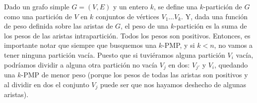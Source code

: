 \documentclass[11pt, a4paper, twoside]{article}
\begin{document}


Dado un grafo simple $G = (V,E)$ y un entero $k$, se define una $k$-partición de $G$ como
una partición de $V$ en $k$ conjuntos de vértices $V_{1} \dots V_{k}$. Y, dada una función
de peso definida sobre las aristas de $G$, el peso de una $k$-partición es la suma de los pesos
de las aristas intrapartición. Todos los pesos son positivos. Entonces, es importante notar que
siempre que busquemos una $k$-PMP, y si $k < n$, no vamos a tener ninguna partición vacía. Puesto 
que si tuviéramos alguna partición $V_{i}$ vacía, podríamos dividir a alguna otra partición no
vacía $V_{j}$ en dos: $V_{j'}$ y $V_{i}$, quedando una $k$-PMP de menor peso (porque los pesos de
todas las aristas son positivos y al dividir en dos el conjunto $V_{j}$ puede ser que nos hayamos
deshecho de algunas aristas).
\end{document}
